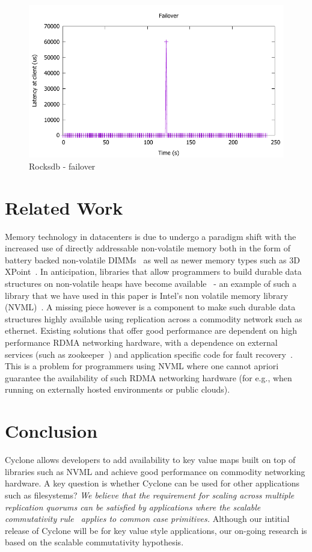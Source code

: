 \documentclass[10pt, preprint, nonatbib]{sigplanconf}
\begin{document}
\begin{figure}
\includegraphics[scale=0.6]{results2/failover.pdf}
\caption{Rocksdb - failover}
\label{fig:timeline}
\end{figure}


\section{Related Work}
Memory technology in datacenters is due to undergo a paradigm shift with the
increased use of directly addressable non-volatile memory both in the form of
battery backed non-volatile DIMMs~\cite{farm} as well as newer memory types such
as 3D XPoint~\cite{pmfs, bpfs}. In anticipation, libraries that allow
programmers to build durable data structures on non-volatile heaps have become
available~\cite{mnemosyne, nvheaps, cdds} - an example of such a library that we
have used in this paper is Intel's non volatile memory library
(NVML)~\cite{nvml}. A missing piece however is a component to make such durable
data structures highly available using replication across a commodity network
such as ethernet. Existing solutions that offer good performance are dependent
on high performance RDMA networking hardware, with a dependence on external
services (such as zookeeper~\cite{zookeeper}) and application specific code for
fault recovery~\cite{farm, htm}.  This is a problem for programmers using NVML
where one cannot apriori guarantee the availability of such RDMA networking
hardware (for e.g., when running on externally hosted environments or public
clouds).

\section{Conclusion}
Cyclone allows developers to add availability to key value maps built on top of
libraries such as NVML and achieve good performance on commodity networking
hardware. A key question is whether Cyclone can be used for other applications
such as filesystems? \emph{We believe that the requirement for scaling across
  multiple replication quorums can be satisfied by applications where the
  scalable commutativity rule~\cite{scalable_commutativity} applies to common
  case primitives.} Although our intitial release of Cyclone will be for key
value style applications, our on-going research is based on the scalable
commutativity hypothesis.
\newcommand\myurl[2]{\url{#1}}


\end{document}
